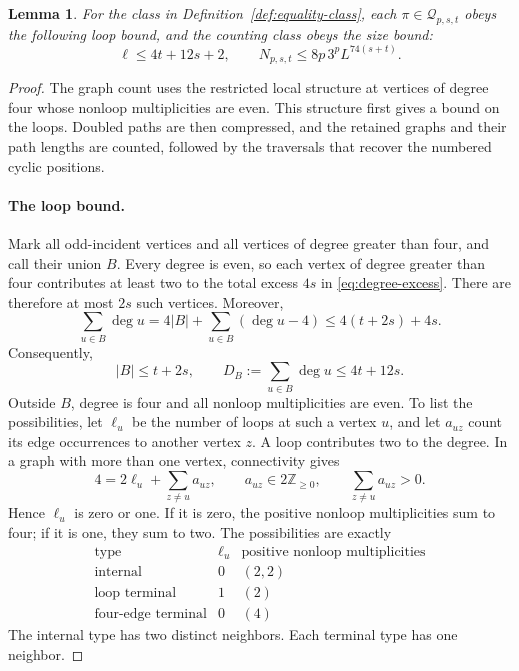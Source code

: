 \documentclass[11pt]{article}
\newtheorem{lemma}[theorem]{Lemma}
\theoremstyle{definition}
\theoremstyle{remark}
\theoremstyle{plain}
\begin{document}
\begin{lemma}\label{lem:count}
For the class in Definition~\ref{def:equality-class}, each
$\pi\in\mathcal Q_{p,s,t}$ obeys the
following loop bound, and the counting class obeys the size bound:
\begin{equation}\label{eq:equality-count}
 \ell\le4t+12s+2,\qquad
                N_{p,s,t}\le8p\,3^p L^{74(s+t)}.
\end{equation}
\end{lemma}
\begin{proof}
The graph count uses the restricted local structure at vertices
of degree four whose nonloop multiplicities are even. This structure
first gives a bound on the loops. Doubled paths are then compressed,
and the retained graphs and their path lengths are counted, followed by
the traversals that recover the numbered cyclic positions.

\paragraph{The loop bound.}
Mark all odd-incident vertices and all vertices of degree greater
than four, and call their union \(B\). Every degree is even, so
each vertex of degree greater than four contributes at least two
to the total excess $4s$ in \eqref{eq:degree-excess}. There are
therefore at most \(2s\) such vertices. Moreover,
\[
 \sum_{u\in B}\deg u
 =4|B|+\sum_{u\in B}(\deg u-4)
 \le4(t+2s)+4s.
\]
Consequently,
\begin{equation}\label{eq:marked-degree}
 |B|\le t+2s,\qquad D_B:=\sum_{u\in B}\deg u\le4t+12s.
\end{equation}
Outside \(B\), degree is four and all nonloop multiplicities are
even. To list the possibilities, let $\ell_u$ be the number of loops
at such a vertex $u$, and let $a_{uz}$ count its edge occurrences
to another vertex $z$. A loop contributes two to the degree. In a
graph with more than one vertex, connectivity gives
\[
 4=2\ell_u+\sum_{z\ne u}a_{uz},\qquad
 a_{uz}\in2\mathbb Z_{\ge0},\qquad
 \sum_{z\ne u}a_{uz}>0.
\]
Hence $\ell_u$ is zero or one. If it is zero, the positive
nonloop multiplicities sum to four; if it is one, they sum to two.
The possibilities are exactly
\[
\begin{array}{c|c|c}
 \text{type} & \ell_u & \text{positive nonloop multiplicities}\\ \hline
 \text{internal} &0&(2,2)\\
 \text{loop terminal} &1&(2)\\
 \text{four-edge terminal} &0&(4)
\end{array}
\]
The internal type has two distinct neighbors. Each terminal type
has one neighbor.


\end{proof}
\end{document}

